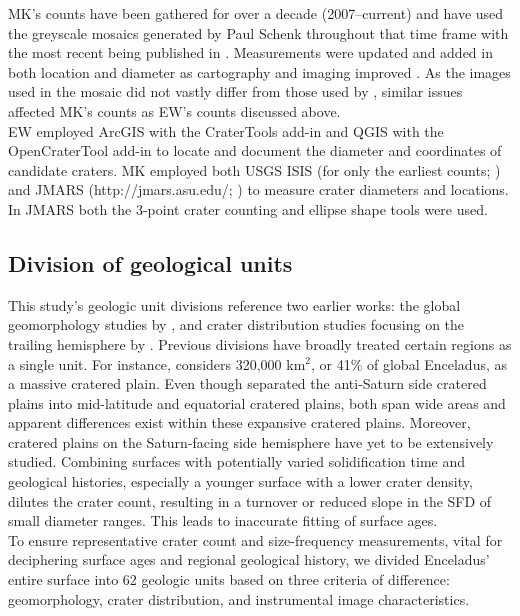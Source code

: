 \documentclass[preprint,11pt,3p,times,authoryear]{elsarticle}
\begin{document}
MK's counts have been gathered for over a decade (2007–current) and have used the greyscale mosaics generated by Paul Schenk throughout that time frame \citep{Schenk2011,Schenk2018} with the most recent being published in \citet{Schenk2024}. Measurements were updated and added in both location and diameter as cartography and imaging improved \citet{Kirchoff2016,Kirchoff2018}. As the images used in the mosaic did not vastly differ from those used by \citet{Bland2018}, similar issues affected MK's counts as EW's counts discussed above.\\

EW employed ArcGIS with the CraterTools add-in \citep{Kneissl2011} and QGIS with the OpenCraterTool add-in \citep{Heyer2023} to locate and document the diameter and coordinates of candidate craters. MK employed both USGS ISIS (for only the earliest counts; \citealt{Kirchoff2009}) and JMARS (http://jmars.asu.edu/; \citealt{Christensen2009}) to measure crater diameters and locations.  In JMARS both the 3-point crater counting and ellipse shape tools were used.

\subsection{Division of geological units}
\label{sub:gu}
This study’s geologic unit divisions reference two earlier works: the global geomorphology studies by \citet{CrowWillard2015}, and crater distribution studies focusing on the trailing hemisphere by \citet{Kirchoff2009}. Previous divisions have broadly treated certain regions as a single unit. For instance, \citet{CrowWillard2015} considers 320,000 km$^{2}$, or 41\% of global Enceladus, as a massive cratered plain. Even though \citet{Kirchoff2009} separated the anti-Saturn side cratered plains into mid-latitude and equatorial cratered plains, both span wide areas and apparent differences exist within these expansive cratered plains. Moreover, cratered plains on the Saturn-facing side hemisphere have yet to be extensively studied. Combining surfaces with potentially varied solidification time and geological histories, especially a younger surface with a lower crater density, dilutes the crater count, resulting in a turnover or reduced slope in the SFD of small diameter ranges. This leads to inaccurate fitting of surface ages. \\

To ensure representative crater count and size-frequency measurements, vital for deciphering surface ages and regional geological history, we divided Enceladus’ entire surface into 62 geologic units based on three criteria of difference: geomorphology, crater distribution, and instrumental image characteristics.
\end{document}
